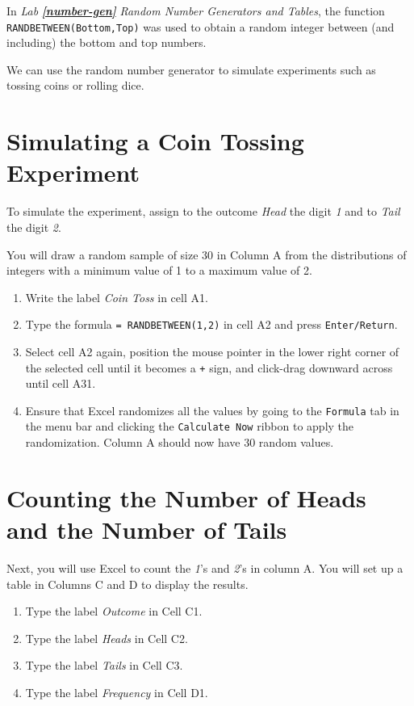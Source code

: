 \documentclass[
]{book}
\providecommand{\tightlist}{%
  \setlength{\itemsep}{0pt}\setlength{\parskip}{0pt}}
\begin{document}
In \emph{Lab} \textbf{\emph{\ref{number-gen}}} \emph{Random Number Generators and Tables}, the function \texttt{RANDBETWEEN(Bottom,Top)} was used to obtain a random integer between (and including) the bottom and top numbers.

We can use the random number generator to simulate experiments such as tossing coins or rolling dice.

\hypertarget{simulating-a-coin-tossing-experiment}{%
\section{Simulating a Coin Tossing Experiment}\label{simulating-a-coin-tossing-experiment}}

To simulate the experiment, assign to the outcome \emph{Head} the digit \emph{1} and to \emph{Tail} the digit \emph{2}.

You will draw a random sample of size 30 in Column A from the distributions of integers with a minimum value of 1 to a maximum value of 2.

\begin{enumerate}
\def\labelenumi{\arabic{enumi}.}
\tightlist
\item
  Write the label \emph{Coin Toss} in cell A1.
\item
  Type the formula \texttt{=\ RANDBETWEEN(1,2)} in cell A2 and press \texttt{Enter/Return}.
\item
  Select cell A2 again, position the mouse pointer in the lower right corner of the selected cell until it becomes a \texttt{+} sign, and click-drag downward across until cell A31.
\item
  Ensure that Excel randomizes all the values by going to the \texttt{Formula} tab in the menu bar and clicking the \texttt{Calculate\ Now} ribbon to apply the randomization. Column A should now have 30 random values.
\end{enumerate}

\hypertarget{counting-the-number-of-heads-and-the-number-of-tails}{%
\section{Counting the Number of Heads and the Number of Tails}\label{counting-the-number-of-heads-and-the-number-of-tails}}

Next, you will use Excel to count the \emph{1}'s and \emph{2}'s in column A. You will set up a table in Columns C and D to display the results.

\begin{enumerate}
\def\labelenumi{\arabic{enumi}.}
\tightlist
\item
  Type the label \emph{Outcome} in Cell C1.
\item
  Type the label \emph{Heads} in Cell C2.
\item
  Type the label \emph{Tails} in Cell C3.
\item
  Type the label \emph{Frequency} in Cell D1.
\end{enumerate}
\end{document}
